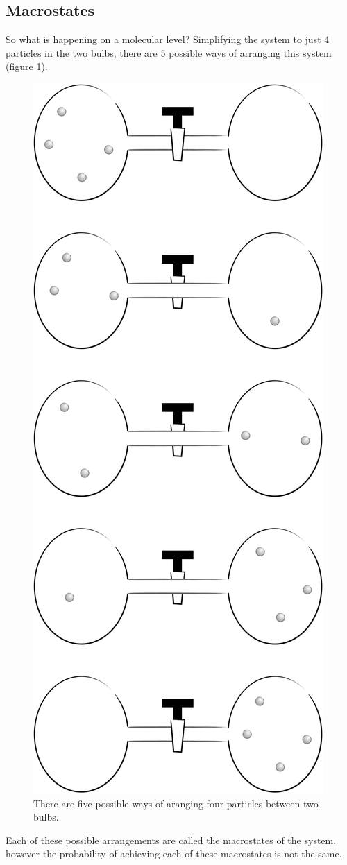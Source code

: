 \documentclass[
]{book}
\begin{document}
\hypertarget{macrostates}{%
\subsection{Macrostates}\label{macrostates}}

So what is happening on a molecular level? Simplifying the system to just 4 particles in the two bulbs, there are 5 possible ways of arranging this system (figure \ref{fig:macro}).

\begin{figure}

{\centering \includegraphics[width=0.5\linewidth]{images/macro} 

}

\caption{There are five possible ways of aranging four particles between two bulbs.}\label{fig:macro}
\end{figure}

Each of these possible arrangements are called the macrostates of the system, however the probability of achieving each of these macrostates is not the same.
\end{document}
